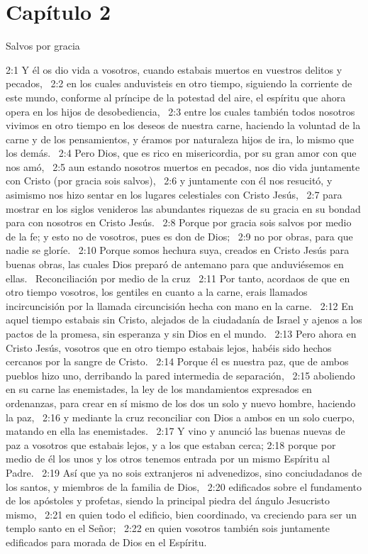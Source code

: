 \section*{Capítulo 2 }
Salvos por gracia  

2:1 Y él os dio vida a vosotros, cuando estabais muertos en vuestros delitos y pecados,  
2:2 en los cuales anduvisteis en otro tiempo, siguiendo la corriente de este mundo, conforme al príncipe de la potestad del aire, el espíritu que ahora opera en los hijos de desobediencia,  
2:3 entre los cuales también todos nosotros vivimos en otro tiempo en los deseos de nuestra carne, haciendo la voluntad de la carne y de los pensamientos, y éramos por naturaleza hijos de ira, lo mismo que los demás.  
2:4 Pero Dios, que es rico en misericordia, por su gran amor con que nos amó,  
2:5 aun estando nosotros muertos en pecados, nos dio vida juntamente con Cristo (por gracia sois salvos),  
2:6 y juntamente con él nos resucitó, y asimismo nos hizo sentar en los lugares celestiales con Cristo Jesús,  
2:7 para mostrar en los siglos venideros las abundantes riquezas de su gracia en su bondad para con nosotros en Cristo Jesús.  
2:8 Porque por gracia sois salvos por medio de la fe; y esto no de vosotros, pues es don de Dios;  
2:9 no por obras, para que nadie se gloríe.  
2:10 Porque somos hechura suya, creados en Cristo Jesús para buenas obras, las cuales Dios preparó de antemano para que anduviésemos en ellas.  
Reconciliación por medio de la cruz  
2:11 Por tanto, acordaos de que en otro tiempo vosotros, los gentiles en cuanto a la carne, erais llamados incircuncisión por la llamada circuncisión hecha con mano en la carne.  
2:12 En aquel tiempo estabais sin Cristo, alejados de la ciudadanía de Israel y ajenos a los pactos de la promesa, sin esperanza y sin Dios en el mundo.  
2:13 Pero ahora en Cristo Jesús, vosotros que en otro tiempo estabais lejos, habéis sido hechos cercanos por la sangre de Cristo.  
2:14 Porque él es nuestra paz, que de ambos pueblos hizo uno, derribando la pared intermedia de separación,  
2:15 aboliendo en su carne las enemistades, la ley de los mandamientos expresados en ordenanzas, para crear en sí mismo de los dos un solo y nuevo hombre, haciendo la paz,  
2:16 y mediante la cruz reconciliar con Dios a ambos en un solo cuerpo, matando en ella las enemistades.  
2:17 Y vino y anunció las buenas nuevas de paz a vosotros que estabais lejos, y a los que estaban cerca; 
2:18 porque por medio de él los unos y los otros tenemos entrada por un mismo Espíritu al Padre.  
2:19 Así que ya no sois extranjeros ni advenedizos, sino conciudadanos de los santos, y miembros de la familia de Dios,  
2:20 edificados sobre el fundamento de los apóstoles y profetas, siendo la principal piedra del ángulo Jesucristo mismo,  
2:21 en quien todo el edificio, bien coordinado, va creciendo para ser un templo santo en el Señor;  
2:22 en quien vosotros también sois juntamente edificados para morada de Dios en el Espíritu.  
